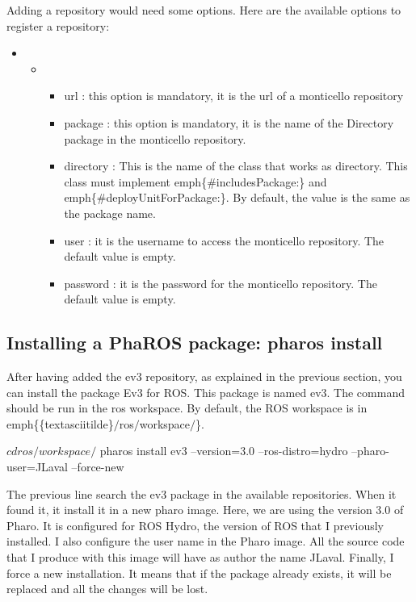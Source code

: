 \documentclass[a4paper,10pt,twoside]{book}
\begin{document}
Adding a repository would need some options. Here are the available options to register a repository:

\begin{itemize}
\item 
\begin{itemize}
\item 
\begin{itemize}
\item url	: this option is mandatory, it is the url of a monticello repository
\item package	: this option is mandatory, it is the name of the Directory package in the monticello repository.
\item directory	: This is the name of the class that works as directory. This class must implement  emph\{\#includesPackage:\} and emph\{\#deployUnitForPackage:\}. By default, the value is the same as the package name.
\item user : it is the username to access the monticello repository. The default value is empty.
\item password : it is the password for the monticello repository. The default value is empty.
\end{itemize}

\end{itemize}

\end{itemize}
\subsection{Installing a PhaROS package: pharos install}
After having added the ev3 repository, as explained in the previous section, you can install the package Ev3 for ROS. This package is named ev3. The command should be run in the ros workspace. By default, the ROS workspace is in emph\{\{textasciitilde\}$/$ros$/$workspace$/$\}.


\begin{code}{}
$ cd ros/workspace/
$ pharos install ev3 --version=3.0 --ros-distro=hydro --pharo-user=JLaval --force-new
\end{code}


The previous line search the ev3 package in the available repositories. When it found it, it install it in a new pharo image. Here, we are using the version 3.0 of Pharo. It is configured for ROS Hydro, the version of ROS that I previously installed. I also configure the user name in the Pharo image. All the source code that I produce with this image will have as author the name JLaval. Finally, I force a new installation. It means that if the package already exists, it will be replaced and all the changes will be lost.
\end{document}
